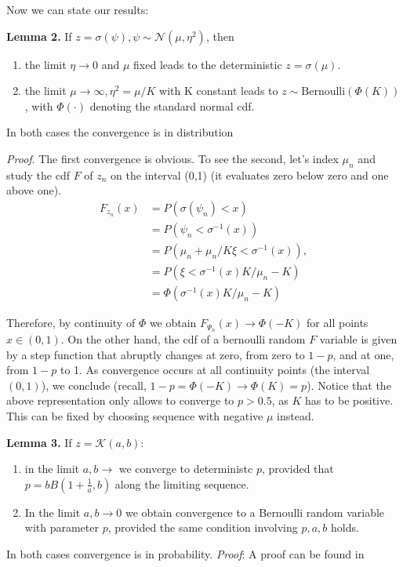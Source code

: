 Now we can state our results:

\textbf{Lemma 2.} If $z=\sigma(\psi),\psi\sim\mathcal{N}(\mu,\eta^2)$, then
\begin{enumerate} \item the  limit $\eta\rightarrow 0$ and $\mu$ fixed leads to the deterministic $z=\sigma(\mu)$. 
\item the limit $\mu\rightarrow \infty, \eta^2=\mu/K$ with K constant leads to $z\sim \text{Bernoulli}(\Phi(K))$, with $\Phi(\cdot)$ denoting the standard normal cdf.
\end{enumerate} In both cases the convergence is in distribution 

\textit{Proof}. The first convergence is obvious. To see the second, let's index $\mu_n$ and  study the cdf $F$ of $z_n$ on the interval (0,1) (it evaluates zero below zero and one above one).
\begin{align}F_{z_n}(x)&= P(\sigma(\psi_n)<x) \\
&=P(\psi_n< \sigma^{-1}(x))\\
&=P(\mu_n +\mu_n/K\xi <\sigma^{-1}(x)),\\\
&= P( \xi <\sigma^{-1}(x)K/\mu_n - K)\\
&= \Phi( \sigma^{-1}(x)K/\mu_n - K) 
\end{align}

Therefore, by continuity of $\Phi$ we obtain $F_{\Psi_n}(x)\rightarrow \Phi(-K)$ for all points $x\in(0,1)$. On the other hand, the cdf of a bernoulli random $F$ variable is given by  a step function that abruptly changes at zero, from zero to $1-p$, and at one, from $1-p$ to 1. As convergence occurs at all continuity points (the interval $(0,1)$), we conclude (recall, $1-p= \Phi(-K)\rightarrow \Phi(K)=p$). Notice that the above representation only allows  to converge to $p>0.5$, as $K$ has to be positive. This can be fixed by choosing sequence with negative $\mu$ instead.

\textbf{Lemma 3.} If $z=\mathcal{K}(a,b)$: \begin{enumerate}
\item in the limit $a,b \rightarrow $  we converge to deterministc $p$, provided that $p=bB\left(1+\frac{1}{a},b\right)$ along the limiting sequence.
\item In the limit $a,b\rightarrow 0$ we obtain convergence to a Bernoulli random variable with parameter $p$, provided the same condition involving $p,a,b$ holds. 
\end{enumerate}
In both cases convergence is in probability.
\textit{Proof}: A proof can be found in \cite{mitnik2013kumar}


